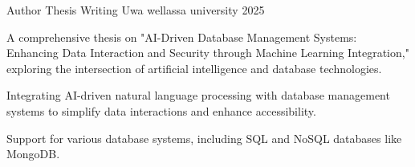 

\begin{cventries}

  \cventry
    {Author} %
    {Thesis Writing} %
    {Uwa wellassa university} %
    {2025} %
    {
      \begin{cvitems} %
        \item {A comprehensive thesis on "AI-Driven Database Management Systems: Enhancing Data Interaction and Security through Machine Learning Integration," exploring the intersection of artificial intelligence and database technologies.}
        \item {Integrating AI-driven natural language processing with database management systems to simplify data interactions and enhance accessibility.}
        \item {Support for various database systems, including SQL and NoSQL databases like MongoDB.}
      \end{cvitems}
    }

\end{cventries}
